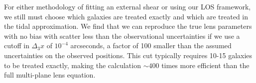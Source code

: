 For either methodology of fitting an external shear or using our LOS framework, we still must choose which galaxies are treated exactly and which are treated in the tidal approximation. We find that we can reproduce the true lens parameters with no bias with scatter less than the observational uncertainties if we use a cutoff in $\Delta_3x$ of $10^{-4}$ arcseconds, a factor of 100 smaller than the assumed uncertainties on the observed positions. This cut typically requires 10-15 galaxies to be treated exactly, making the calculation $\sim 400$ times more efficient than the full multi-plane lens equation.
 